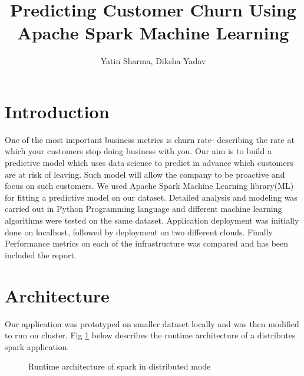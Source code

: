 \documentclass[9pt,twocolumn,twoside]{../../styles/osajnl}
\title{Predicting Customer Churn Using Apache Spark Machine Learning}
\author[1,*]{Yatin Sharma, Diksha Yadav}
\affil[1]{School of Informatics and Computing, Bloomington, IN 47408, U.S.A.}
\affil[*]{Corresponding authors: yatins@indiana.edu, yadavd@iu.edu}
\begin{document}
\setcounter{tocdepth}{5}
\setcounter{secnumdepth}{5}
\maketitle

\tableofcontents %

\section{Introduction}
	One of the most important business metrics is churn rate- describing the rate at which your customers stop doing business with you. Our aim is to build a predictive model which uses data science to predict in advance which customers are at risk of leaving. Such model will allow the company to be proactive and focus on such customers. We used Apache Spark\cite{www-apache-spark} Machine Learning library(ML)\cite{www-Spark-ML} for fitting a predictive model on our dataset. Detailed analysis and modeling was carried out in Python Programming language and different machine learning algorithms were tested on the same dataset. Application deployment was initially done on localhost, followed by deployment on two different clouds. Finally Performance metrics on each of the infrastructure was compared and has been included the report.
	



\section{Architecture}
	Our application was prototyped on smaller dataset locally and was then modified to run on cluster. Fig \ref{Architecture} below describes the runtime architecture of a distributes spark application. 
	
	\begin{figure}[htbp]
		\centering
		\caption{Runtime architecture of spark in distributed mode\cite{Learn-Spark}}
		\label{Architecture}
		\end{figure}
			
\end{document}
